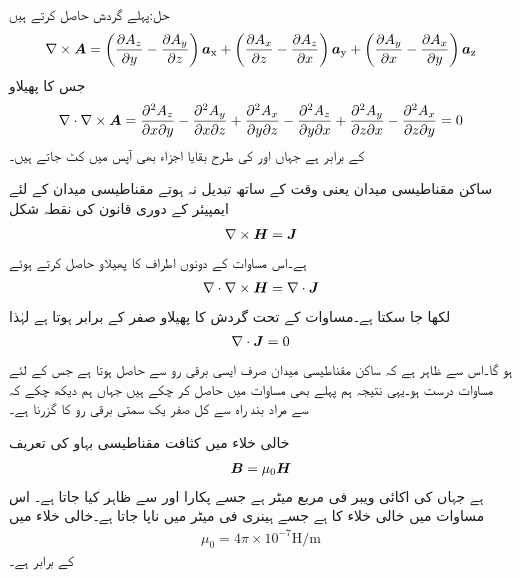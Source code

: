 حل:پہلے گردش حاصل کرتے ہیں
\begin{align*}
\nabla \times {\ensuremath{{\boldsymbol{A}}}}=\left(\frac{\partial A_z}{\partial y}-\frac{\partial A_y}{\partial z} \right){\boldsymbol{a}}_{\textup{x}}+\left(\frac{\partial A_x}{\partial z}-\frac{\partial A_z}{\partial x} \right){\boldsymbol{a}}_{\textup{y}}+\left(\frac{\partial A_y}{\partial x}-\frac{\partial A_x}{\partial y} \right){\boldsymbol{a}}_{\textup{z}}
\end{align*}
جس کا پھیلاو
\begin{align*}
\nabla \cdot \nabla \times {\ensuremath{{\boldsymbol{A}}}}=\frac{\partial^2 A_z}{\partial x \partial y}-\frac{\partial^2 A_y}{\partial x \partial z}+\frac{\partial^2 A_x}{\partial y \partial z}-\frac{\partial^2 A_z}{\partial y \partial x}+\frac{\partial^2 A_y}{\partial z \partial x}-\frac{\partial^2 A_x}{\partial z \partial y}=0
\end{align*}
کے برابر ہے جہاں  اور  کی طرح بقایا اجزاء بھی آپس میں کٹ جاتے ہیں۔

ساکن مقناطیسی میدان یعنی وقت کے ساتھ تبدیل نہ ہوتے مقناطیسی میدان کے لئے ایمپیئر کے دوری قانون کی نقطہ شکل
\begin{align*}
\nabla \times {\ensuremath{{\boldsymbol{H}}}}={{\boldsymbol{J}}}
\end{align*}
ہے۔اس مساوات کے دونوں اطراف کا پھیلاو حاصل کرتے ہوئے
\begin{align*}
\nabla \cdot \nabla \times {\ensuremath{{\boldsymbol{H}}}}=\nabla \cdot {\ensuremath{{\boldsymbol{J}}}}
\end{align*}
لکھا جا سکتا ہے۔مساوات  کے تحت گردش کا پھیلاو صفر کے برابر ہوتا ہے لہٰذا
\begin{align}\label{مساوات_مقناطیسی_استمراری_مساوات}
\nabla \cdot {\ensuremath{{\boldsymbol{J}}}}=0
\end{align}
ہو گا۔اس سے ظاہر ہے کہ ساکن مقناطیسی میدان صرف ایسی برقی رو سے حاصل ہوتا ہے  جس کے لئے مساوات  درست ہو۔یہی نتیجہ ہم پہلے بھی مساوات  میں حاصل کر چکے ہیں جہاں ہم دیکھ چکے کہ  سے مراد بند راہ سے کل صفر یک سمتی برقی رو کا گزرنا ہے۔

خالی خلاء میں کثافت مقناطیسی بہاو  کی تعریف
\begin{align}\label{مساوات_مقناطیسی_میدان_بالمقابل_شدت}
{\ensuremath{{\boldsymbol{B}}}}=\mu_0 {{\boldsymbol{H}}}
\end{align}
ہے جہاں  کی اکائی ویبر فی مربع میٹر  ہے جسے  پکارا اور  سے ظاہر کیا جاتا ہے۔ اس مساوات میں  خالی خلاء کا  ہے جسے ہینری فی میٹر  میں ناپا جاتا ہے۔خالی خلاء میں
\begin{align}
\mu_0=4\pi \times 10^{-7} \si{\henry \per \meter}
\end{align}
کے برابر ہے۔

